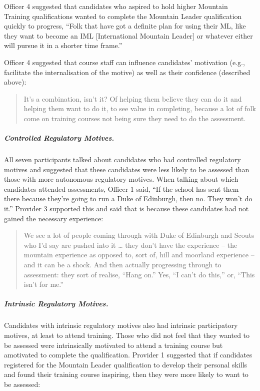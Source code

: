 \documentclass[
  12pt,
  a4paper,
]{book}
\begin{document}
Officer 4 suggested that candidates who aspired to hold higher Mountain Training qualifications wanted to complete the Mountain Leader qualification quickly to progress, ``Folk that have got a definite plan for using their ML, like they want to become an IML {[}International Mountain Leader{]} or whatever either will pursue it in a shorter time frame.''

Officer 4 suggested that course staff can influence candidates' motivation (e.g., facilitate the internalisation of the motive) as well as their confidence (described above):

\begin{quote}
It's a combination, isn't it? Of helping them believe they can do it and helping them want to do it, to see value in completing, because a lot of folk come on training courses not being sure they need to do the assessment.
\end{quote}

\hypertarget{controlled-regulatory-motives.}{%
\subparagraph{Controlled Regulatory Motives.}\label{controlled-regulatory-motives.}}

All seven participants talked about candidates who had controlled regulatory motives and suggested that these candidates were less likely to be assessed than those with more autonomous regulatory motives. When talking about which candidates attended assessments, Officer 1 said, ``If the school has sent them there because they're going to run a Duke of Edinburgh, then no. They won't do it.'' Provider 3 supported this and said that is because these candidates had not gained the necessary experience:

\begin{quote}
We see a lot of people coming through with Duke of Edinburgh and Scouts who I'd say are pushed into it \ldots{} they don't have the experience -- the mountain experience as opposed to, sort of, hill and moorland experience -- and it can be a shock. And then actually progressing through to assessment: they sort of realise, ``Hang on.'' Yes, ``I can't do this,'' or, ``This isn't for me.''
\end{quote}

\hypertarget{intrinsic-regulatory-motives.}{%
\subparagraph{Intrinsic Regulatory Motives.}\label{intrinsic-regulatory-motives.}}

Candidates with intrinsic regulatory motives also had intrinsic participatory motives, at least to attend training. Those who did not feel that they wanted to be assessed were intrinsically motivated to attend a training course but amotivated to complete the qualification. Provider 1 suggested that if candidates registered for the Mountain Leader qualification to develop their personal skills and found their training course inspiring, then they were more likely to want to be assessed:
\end{document}
